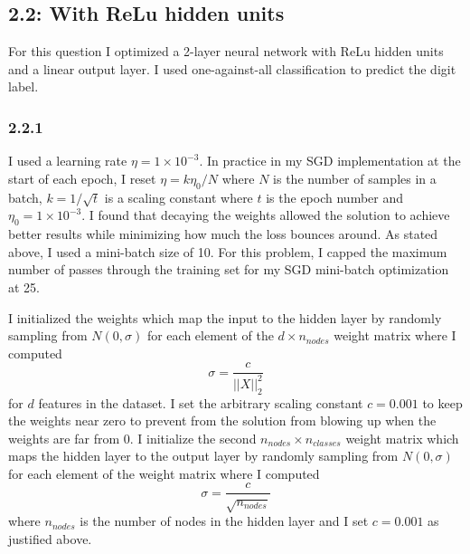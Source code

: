 \documentclass[12pt]{amsart}
\begin{document}
\subsection*{2.2: With ReLu hidden units}
For this question I optimized a 2-layer neural network with ReLu hidden units and a linear output layer.  I used one-against-all classification to predict the digit label.

\subsubsection*{2.2.1}
I used a learning rate $\eta = 1 \times 10^{-3}$.  In practice in my SGD implementation at the start of each epoch, I reset $\eta = k\eta_0/N$ where $N$ is the number of samples in a batch, $k = 1/\sqrt{t}$ is a scaling constant where $t$ is the epoch number and $\eta_0 = 1 \times 10^{-3}$.  I found that decaying the weights allowed the solution to achieve better results while minimizing how much the loss bounces around.   As stated above, I used a mini-batch size of 10.  For this problem, I capped the maximum number of passes through the training set for my SGD mini-batch optimization at 25.

I initialized the weights which map the input to the hidden layer by randomly sampling from $N(0,\sigma)$ for each element of the $d \times n_{nodes}$ weight matrix where I computed 
\begin{equation}
\sigma = \frac{c}{||X||^2_2}
\end{equation}
for $d$ features in the dataset.  I set the arbitrary scaling constant $c = 0.001$ to keep the weights near zero to prevent from the solution from blowing up when the weights are far from 0.  I initialize the second $n_{nodes} \times n_{classes}$ weight matrix which maps the hidden layer to the output layer by randomly sampling from $N(0,\sigma)$ for each element of the weight matrix where I computed 
\begin{equation}
\sigma = \frac{c}{\sqrt{n_{nodes}}}
\end{equation}
where $n_{nodes}$ is the number of nodes in the hidden layer and I set $c = 0.001$ as justified above.
\end{document}
